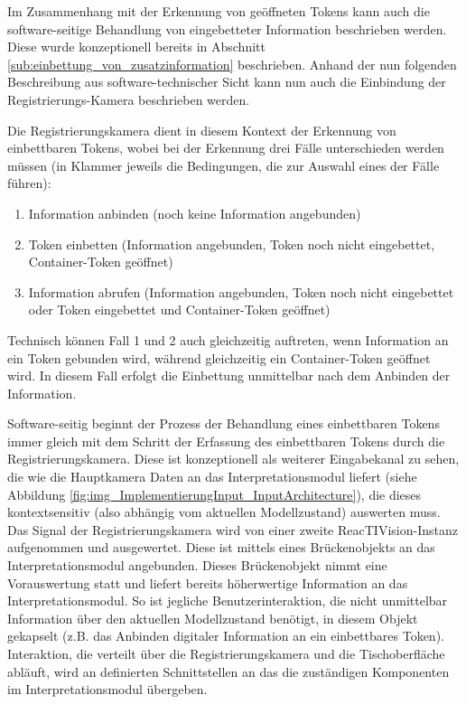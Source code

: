 Im Zusammenhang mit der Erkennung von geöffneten Tokens kann auch die software-seitige Behandlung von eingebetteter Information beschrieben werden. Diese wurde konzeptionell bereits in Abschnitt \ref{sub:einbettung_von_zusatzinformation} beschrieben. Anhand der nun folgenden Beschreibung aus software-technischer Sicht kann nun auch die Einbindung der Registrierungs-Kamera beschrieben werden.

Die Registrierungskamera dient in diesem Kontext der Erkennung von einbettbaren Tokens, wobei bei der Erkennung drei Fälle unterschieden werden müssen (in Klammer jeweils die Bedingungen, die zur Auswahl eines der Fälle führen):
\begin{enumerate}
	\item Information anbinden (noch keine Information angebunden)
	\item Token einbetten (Information angebunden, Token noch nicht eingebettet, Container-Token geöffnet)
	\item Information abrufen (Information angebunden, Token noch nicht eingebettet oder Token eingebettet und Container-Token geöffnet)
\end{enumerate}
Technisch können Fall 1 und 2 auch gleichzeitig auftreten, wenn Information an ein Token gebunden wird, während gleichzeitig ein Container-Token geöffnet wird. In diesem Fall erfolgt die Einbettung unmittelbar nach dem Anbinden der Information.

Software-seitig beginnt der Prozess der Behandlung eines einbettbaren Tokens immer gleich mit dem Schritt der Erfassung des einbettbaren Tokens durch die Registrierungskamera. Diese ist konzeptionell als weiterer Eingabekanal zu sehen, die wie die Hauptkamera Daten an das Interpretationsmodul liefert (siehe Abbildung \ref{fig:img_ImplementierungInput_InputArchitecture}), die dieses kontextsensitiv (also abhängig vom aktuellen Modellzustand) auswerten muss. Das Signal der Registrierungskamera wird von einer zweite ReacTIVision-Instanz aufgenommen und ausgewertet. Diese ist mittels eines Brückenobjekts an das Interpretationsmodul angebunden. Dieses Brückenobjekt nimmt eine Vorauswertung statt und liefert bereits höherwertige Information an das Interpretationsmodul. So ist jegliche Benutzerinteraktion, die nicht unmittelbar Information über den aktuellen Modellzustand benötigt, in diesem Objekt gekapselt (z.B. das Anbinden digitaler Information an ein einbettbares Token). Interaktion, die verteilt über die Registrierungskamera und die Tischoberfläche abläuft, wird an definierten Schnittstellen an das die zuständigen Komponenten im Interpretationsmodul übergeben.

